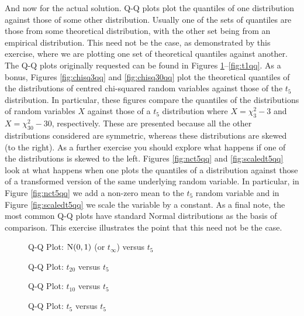 And now for the actual solution.  Q-Q plots plot the quantiles of one distribution against those of
some other distribution.  Usually one of the sets of quantiles are those from some theoretical
distribution, with the other set being from an empirical distribution.  This need not be the case,
as demonstrated by this exercise, where we are plotting one set of theoretical quantiles against
another.  The Q-Q plots originally requested can be found in Figures
\ref{fig:normqq}--\ref{fig:t1qq}.  As a bonus, Figures \ref{fig:chisq3qq} and \ref{fig:chisq30qq}
plot the theoretical quantiles of the distributions of centred chi-squared random variables against
those of the \( t_{5} \) distribution.  In particular, these figures compare the quantiles of the
distributions of random variables \( X \) against those of a \( t_{5} \) distribution where \(
X=\chi^{2}_{3}-3 \) and \( X=\chi^{2}_{30}-30 \), respectively.  These are presented because all the
other distributions considered are symmetric, whereas these distributions are skewed (to the right).
As a further exercise you should explore what happens if one of the distributions is skewed to the
left.  Figures \ref{fig:nct5qq} and \ref{fig:scaledt5qq} look at what happens when one plots the
quantiles of a distribution against those of a transformed version of the same underlying random
variable.  In particular, in Figure \ref{fig:nct5qq} we add a non-zero mean to the \( t_{5} \)
random variable and in Figure \ref{fig:scaledt5qq} we scale the variable by a constant.  As a final
note, the most common Q-Q plots have standard Normal distributions as the basis of comparison.  This
exercise illustrates the point that this need not be the case.
\begin{figure}[tbp]
   \centering
   
   \caption{Q-Q Plot: \( \operatorname{N}(0,1) \) (or \( t_{\infty} \)) versus \( t_{5} \)}
   \label{fig:normqq}
\end{figure}
\begin{figure}[tbp]
   \centering
   
   \caption{Q-Q Plot: \( t_{20} \) versus \( t_{5} \)}
   \label{fig:t20qq}
\end{figure}
\begin{figure}[tbp]
   \centering
   
   \caption{Q-Q Plot: \( t_{10} \) versus \( t_{5} \)}
   \label{fig:t10qq}
\end{figure}
\begin{figure}[tbp]
   \centering
   
   \caption{Q-Q Plot: \( t_{5} \) versus \( t_{5} \)}
   \label{fig:t5qq}
\end{figure}
